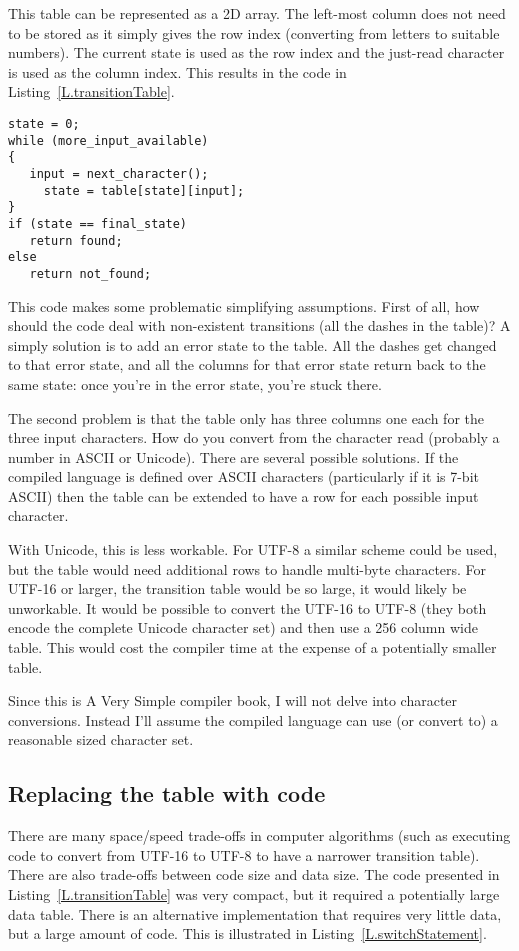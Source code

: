 \documentclass[letterpaper,12pt,openany,reqno]{book}%
\begin{document}
This table can be represented as a 2D array. The left-most column does not need to be stored as it simply gives the row index (converting from letters to suitable numbers). The current state is used as the row index and the just-read character is used as the column index. This results in the code in Listing~\ref{L.transitionTable}.
\begin{lstlisting}[caption={Pseudo-code for processing a transition table.},label=L.transitionTable]
state = 0;
while (more_input_available)
{
   input = next_character();
	 state = table[state][input];
}
if (state == final_state) 
   return found;
else
   return not_found;
\end{lstlisting}

This code makes some problematic simplifying assumptions. First of all, how should the code deal with non-existent transitions (all the dashes in the table)? A simply solution is to add an error state to the table. All the dashes get changed to that error state, and all the columns for that error state return back to the same state: once you're in the error state, you're stuck there.

The second problem is that the table only has three columns one each for the three input characters. How do you convert from the character read (probably a number in ASCII or Unicode). There are several possible solutions. If the compiled language is defined over ASCII characters (particularly if it is 7-bit ASCII) then the table can be extended to have a row for each possible input character. 

With Unicode, this is less workable. For UTF-8 a similar scheme could be used, but the table would need additional rows to handle multi-byte characters. For UTF-16 or larger, the transition table would be so large, it would likely be unworkable. It would be possible to convert the UTF-16 to UTF-8 (they both encode the complete Unicode character set) and then use a 256 column wide table. This would cost the compiler time at the expense of a potentially smaller table.

Since this is A Very Simple compiler book, I will not delve into character conversions. Instead I'll assume the compiled language can use (or convert to) a reasonable sized character set.

\subsection{Replacing the table with code}

There are many space/speed trade-offs in computer algorithms (such as executing code to convert from UTF-16 to UTF-8 to have a narrower transition table). There are also trade-offs between code size and data size. The code presented in Listing~\ref{L.transitionTable} was very compact, but it required a potentially large data table. There is an alternative implementation that requires very little data, but a large amount of code. This is illustrated in Listing~\ref{L.switchStatement}.
\end{document}
